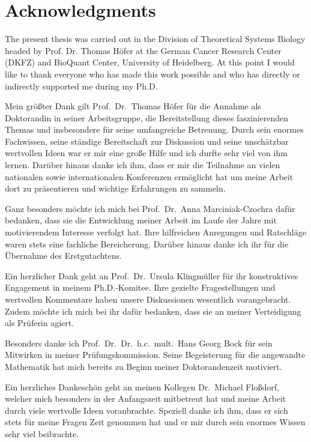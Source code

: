 \chapter*{Acknowledgments}


The present thesis was carried out in the Division of Theoretical Systems Biology headed by 
Prof. Dr. Thomas H\"ofer at the German Cancer Research Center (DKFZ) and BioQuant Center, 
University of Heidelberg. At this point I would like to thank everyone who has made this work 
possible and who has directly or indirectly supported me during my Ph.D. 

Mein gr\"o\ss ter Dank gilt Prof.\ Dr.\ Thomas H\"ofer f\"{u}r die Annahme als Doktorandin in 
seiner Arbeitsgruppe, die Bereitstellung dieses faszinierenden Themas und insbesondere f\"{u}r seine umfangreiche 
Betreuung. 
Durch sein enormes Fachwissen, seine st\"{a}ndige Bereitschaft zur Diskussion und seine 
unsch\"{a}tzbar wertvollen Ideen war er mir eine gro\ss e Hilfe und ich durfte sehr viel von ihm 
lernen. Dar\"{u}ber hinaus danke ich ihm, dass er mir die Teilnahme an vielen 
nationalen sowie internationalen Konferenzen erm\"{o}glicht hat um meine Arbeit dort zu 
pr\"{a}sentieren und wichtige Erfahrungen zu sammeln.

Ganz besonders m\"{o}chte ich mich bei Prof.\ Dr.\ Anna Marciniak-Czochra daf\"{u}r 
bedanken, 
dass sie die Entwicklung meiner Arbeit im Laufe der Jahre mit motivierendem Interesse 
verfolgt 
hat.
Ihre hilfreichen Anregungen und Ratschl\"{a}ge waren stets eine fachliche Bereicherung. 
Dar\"{u}ber hinaus danke ich ihr f\"{u}r die \"{U}bernahme des 
Erstgutachtens.

Ein herzlicher Dank geht an Prof.\ Dr.\ Ursula Klingm\"{u}ller f\"{u}r ihr konstruktives Engagement in meinem Ph.D.-Komitee. Ihre gezielte Fragestellungen und wertvollen Kommentare haben 
unsere Diskussionen wesentlich vorangebracht. Zudem m\"{o}chte ich mich bei ihr daf\"{u}r 
bedanken, dass sie an meiner Verteidigung als Pr\"{u}ferin agiert.

Besonders danke ich Prof.\ Dr.\ Dr.\ h.c.\ mult.\ Hans Georg Bock f\"{u}r sein Mitwirken in meiner Pr\"{u}fungskommission. Seine Begeisterung f\"{u}r die angewandte Mathematik hat mich bereits zu Beginn meiner Doktorandenzeit motiviert. 

Ein herzliches Dankesch\"{o}n geht an meinen Kollegen Dr.\ Michael Flo\ss dorf, welcher mich besonders in der Anfangszeit mitbetreut hat und meine Arbeit durch viele wertvolle Ideen voranbrachte. Speziell danke ich ihm, dass er sich stets f\"{u}r meine Fragen Zeit genommen hat und er mir durch sein enormes Wissen sehr viel beibrachte.


